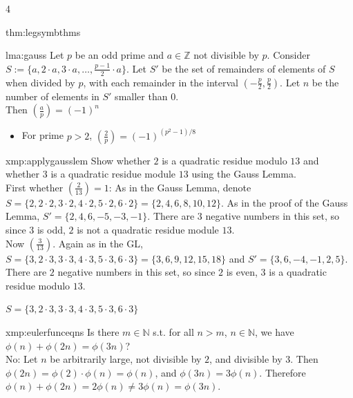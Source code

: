\documentclass[landscape, 8pt]{extarticle}
\begin{document}
\begin{multicols*}{4}
\begin{thm}{thm:legsymbthms}{ }
		\end{thm}
		
		
		\begin{lma}{lma:gauss}{ }
			Let $p$ be an odd prime and $a\in \mathbb{Z}$ not divisible by $p$. Consider $S := \{a, 2\cdot a, 3\cdot a, \dots, \frac{p-1}{2}\cdot a\}$. Let $S'$ be the set of remainders of elements of $S$ when divided by $p$, with each remainder in the interval $(-\frac{p}{2}, \frac{p}{2})$. Let $n$ be the number of elements in $S'$ smaller than $0$. \\
			Then $(\frac{a}{p}) = (-1)^n$
			\begin{itemize}
				\item For prime $p > 2$, $(\frac{2}{p}) = (-1)^{(p^2-1)/8}$
			\end{itemize}
		
		\end{lma}
		
		
		\begin{xmp}{xmp:applygausslem}{ }
			Show whether $2$ is a quadratic residue modulo $13$ and whether $3$ is a quadratic residue module $13$ using the Gauss Lemma.\\
			First whether $(\frac{2}{13}) = 1$: As in the Gauss Lemma, denote $S = \{2, 2\cdot 2, 3\cdot 2, 4\cdot 2, 5\cdot 2, 6\cdot 2\} = \{2, 4, 6, 8, 10, 12\}$. As in the proof of the Gauss Lemma, $S' = \{2, 4, 6, -5, -3, -1\}$. There are $3$ negative numbers in this set, so since $3$ is odd, $2$ is not a quadratic residue module $13$.\\
			Now $(\frac{3}{13})$. Again as in the GL, $S = \{3, 2\cdot 3, 3\cdot 3, 4\cdot 3, 5\cdot 3, 6\cdot 3\} = \{3, 6, 9, 12, 15, 18\}$ and $S' = \{3, 6, -4, -1, 2, 5\}$. There are $2$ negative numbers in this set, so since $2$ is even, $3$ is a quadratic residue modulo $13$.
			
			
			
			 $S = \{3, 2\cdot 3, 3\cdot 3, 4\cdot 3, 5\cdot 3, 6\cdot 3\} $
			
		\end{xmp}
		
		
		\begin{xmp}{xmp:eulerfunceqns}{ }
			Is there $m\in \mathbb{N}$ s.t. for all $n > m$, $n\in \mathbb{N}$, we have $\phi(n) + \phi(2n) = \phi(3n)$?\\
			No: Let $n$ be arbitrarily large, not divisible by $2$, and divisible by $3$. Then $\phi(2n) = \phi(2)\cdot \phi(n) = \phi(n)$, and $\phi(3n) = 3\phi(n)$. Therefore $\phi(n) + \phi(2n) = 2\phi(n) \ne 3\phi(n) = \phi(3n)$.
			

\end{xmp}
\end{multicols*}
\end{document}
